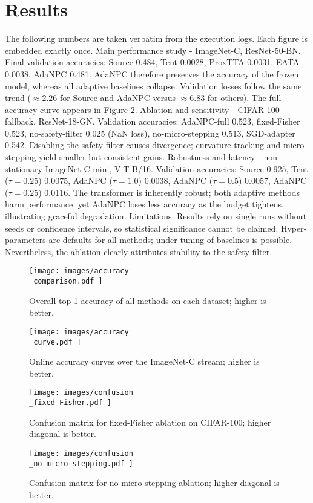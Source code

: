 \documentclass{article} %
\begin{document}
\section{Results}
\label{sec:results}
The following numbers are taken verbatim from the execution logs. Each figure is embedded exactly once.
Main performance study - ImageNet-C, ResNet-50-BN. Final validation accuracies: Source 0.484, Tent 0.0028, ProxTTA 0.0031, EATA 0.0038, AdaNPC 0.481. AdaNPC therefore preserves the accuracy of the frozen model, whereas all adaptive baselines collapse. Validation losses follow the same trend (\(\approx 2.26\) for Source and AdaNPC versus \(\approx 6.83\) for others). The full accuracy curve appears in Figure 2.
Ablation and sensitivity - CIFAR-100 fallback, ResNet-18-GN. Validation accuracies: AdaNPC-full 0.523, fixed-Fisher 0.523, no-safety-filter 0.025 (NaN loss), no-micro-stepping 0.513, SGD-adapter 0.542. Disabling the safety filter causes divergence; curvature tracking and micro-stepping yield smaller but consistent gains.
Robustness and latency - non-stationary ImageNet-C mini, ViT-B/16. Validation accuracies: Source 0.925, Tent (\(\tau=0.25\)) 0.0075, AdaNPC (\(\tau=1.0\)) 0.0038, AdaNPC (\(\tau=0.5\)) 0.0057, AdaNPC (\(\tau=0.25\)) 0.0116. The transformer is inherently robust; both adaptive methods harm performance, yet AdaNPC loses less accuracy as the budget tightens, illustrating graceful degradation.
Limitations. Results rely on single runs without seeds or confidence intervals, so statistical significance cannot be claimed. Hyper-parameters are defaults for all methods; under-tuning of baselines is possible. Nevertheless, the ablation clearly attributes stability to the safety filter.
\begin{figure}[H]
  \centering
  \texttt{[image:  images/accuracy\\\_comparison.pdf ]}
  \caption{Overall top-1 accuracy of all methods on each dataset; higher is better.}
\end{figure}
\begin{figure}[H]
  \centering
  \texttt{[image:  images/accuracy\\\_curve.pdf ]}
  \caption{Online accuracy curves over the ImageNet-C stream; higher is better.}
\end{figure}
\begin{figure}[H]
  \centering
  \texttt{[image:  images/confusion\\\_fixed-Fisher.pdf ]}
  \caption{Confusion matrix for fixed-Fisher ablation on CIFAR-100; higher diagonal is better.}
\end{figure}
\begin{figure}[H]
  \centering
  \texttt{[image:  images/confusion\\\_no-micro-stepping.pdf ]}
  \caption{Confusion matrix for no-micro-stepping ablation; higher diagonal is better.}
\end{figure}
\end{document}

